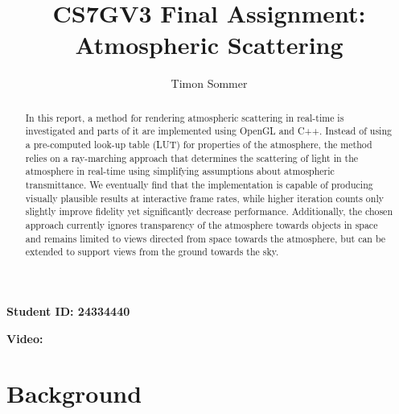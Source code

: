 \documentclass[12pt]{article}
\begin{document}
\author{Timon Sommer}
\title{CS7GV3 Final Assignment: \\ Atmospheric Scattering}
\date{}
\maketitle

\textbf{Student ID: 24334440}

\textbf{Video: \url{}}

\medskip

\begin{abstract}
In this report, a method for rendering atmospheric scattering in real-time is investigated and parts of it are implemented using OpenGL and C++.
Instead of using a pre-computed look-up table (LUT) for properties of the atmosphere, the method relies on a ray-marching approach that determines the scattering of light in the atmosphere in real-time using simplifying assumptions about atmospheric transmittance.
We eventually find that the implementation is capable of producing visually plausible results at interactive frame rates, while higher iteration counts only slightly improve fidelity yet significantly decrease performance.
Additionally, the chosen approach currently ignores transparency of the atmosphere towards objects in space and remains limited to views directed from space towards the atmosphere, but can be extended to support views from the ground towards the sky.

\end{abstract}

\section{Background}
\end{document}

